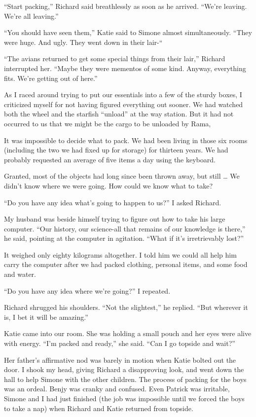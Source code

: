 \documentclass[]{article}
\begin{document}
{“Start packing,” Richard said breathlessly as soon as he arrived.  “We’re leaving.  We’re all leaving.”

“You should have seen them,” Katie said to Simone almost simultaneously.  “They were huge.  And ugly.  They went down in their lair-“

“The avians returned to get some special things from their lair,” Richard interrupted her.  “Maybe they were mementos of some kind.  Anyway, everything fits.  We’re getting out of here.”

As I raced around trying to put our essentials into a few of the sturdy boxes, I criticized myself for not having figured everything out sooner.  We had watched both the wheel and the starfish “unload” at the way station.  But it had not occurred to us that we might be the cargo to be unloaded by Rama,

It was impossible to decide what to pack.  We had been living in those six rooms (including the two we had fixed up for storage) for thirteen years.  We had probably requested an average of five items a day using the keyboard.

Granted, most of the objects had long since been thrown away, but still … We didn’t know where we were going.  How could we know what to take?

“Do you have any idea what’s going to happen to us?” I asked Richard.

My husband was beside himself trying to figure out how to take his large computer.  “Our history, our science-all that remains of our knowledge is there,” he said, pointing at the computer in agitation.  “What if it’s irretrievably lost?”

It weighed only eighty kilograms altogether.  I told him we could all help him carry the computer after we had packed clothing, personal items, and some food and water.

“Do you have any idea where we’re going?” I repeated.

Richard shrugged his shoulders.  “Not the slightest,” he replied.  “But wherever it is, I bet it will be amazing.”

Katie came into our room.  She was holding a small pouch and her eyes were alive with energy.  “I’m packed and ready,” she said.  “Can I go topside and wait?”

Her father’s affirmative nod was barely in motion when Katie bolted out the door.  I shook my head, giving Richard a disapproving look, and went down the hall to help Simone with the other children.  The process of packing for the boys was an ordeal.  Benjy was cranky and confused.  Even Patrick was irritable, Simone and I had just finished (the job was impossible until we forced the boys to take a nap) when Richard and Katie returned from topside.

}
\end{document}
